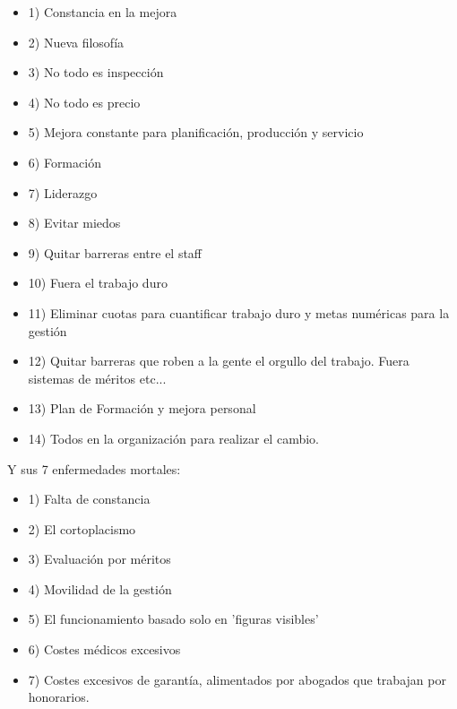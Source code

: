 \documentclass[]{article}
\begin{document}
\begin{itemize} \item 1) Constancia en la mejora \item  2) Nueva filosofía \item  3) No todo es inspección  \item 4) No todo es precio \item  5) Mejora constante para planificación, producción y servicio \item 6) Formación \item 7) Liderazgo \item 8) Evitar miedos \item 9) Quitar barreras entre el staff \item 10) Fuera el trabajo duro \item 11) Eliminar cuotas para cuantificar trabajo duro y metas numéricas para la gestión \item 12) Quitar barreras que roben a la gente el orgullo del trabajo. Fuera sistemas de méritos etc... \item 13) Plan de Formación y mejora personal \item 14) Todos en la organización para realizar el cambio. \end{itemize}  Y sus 7 enfermedades mortales: \begin{itemize} \item 1) Falta de constancia \item 2) El cortoplacismo \item 3) Evaluación por méritos \item 4) Movilidad de la gestión \item 5) El funcionamiento basado solo en 'figuras visibles' \item 6) Costes médicos excesivos \item 7) Costes excesivos de garantía, alimentados por abogados que trabajan por honorarios. \end{itemize}
\end{document}
